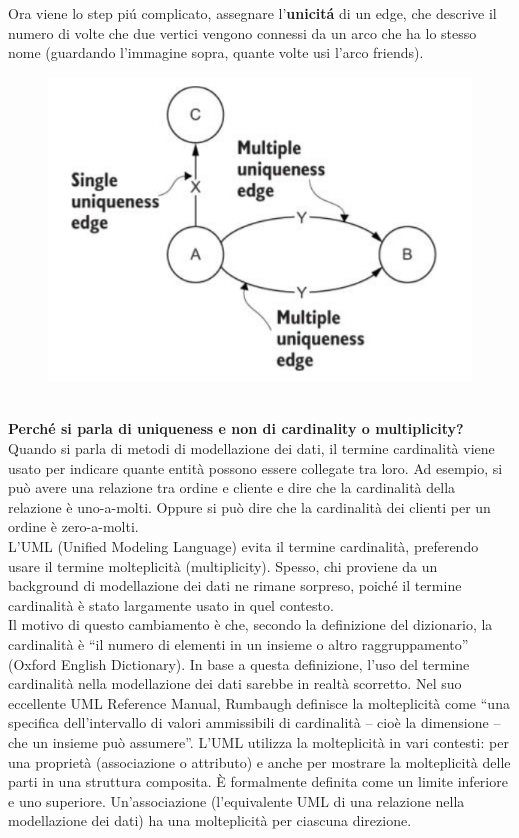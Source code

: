 \newpage

Ora viene lo step piú complicato, assegnare l'\textbf{unicitá} di un edge, che descrive il numero di volte che due vertici vengono connessi da un arco che ha lo stesso nome (guardando l'immagine sopra, quante volte usi l'arco friends). 
\\
\begin{figure}[th]
    \centering
    \includegraphics[width=0.5\linewidth]{GraphModeling//img/uniqueness.png}
\end{figure}
\\
\textbf{Perché si parla di uniqueness e non di cardinality o multiplicity?} Quando si parla di metodi di modellazione dei dati, il termine cardinalità viene usato per indicare quante entità possono essere collegate tra loro. Ad esempio, si può avere una relazione tra ordine e cliente e dire che la cardinalità della relazione è uno-a-molti. Oppure si può dire che la cardinalità dei clienti per un ordine è zero-a-molti. \\
L’UML (Unified Modeling Language) evita il termine cardinalità, preferendo usare il termine molteplicità (multiplicity). Spesso, chi proviene da un background di modellazione dei dati ne rimane sorpreso, poiché il termine cardinalità è stato largamente usato in quel contesto. \\
Il motivo di questo cambiamento è che, secondo la definizione del dizionario, la cardinalità è “il numero di elementi in un insieme o altro raggruppamento” (Oxford English Dictionary). In base a questa definizione, l’uso del termine cardinalità nella modellazione dei dati sarebbe in realtà scorretto. Nel suo eccellente UML Reference Manual, Rumbaugh definisce la molteplicità come “una specifica dell’intervallo di valori ammissibili di cardinalità – cioè la dimensione – che un insieme può assumere”. L’UML utilizza la molteplicità in vari contesti: per una proprietà (associazione o attributo) e anche per mostrare la molteplicità delle parti in una struttura composita. È formalmente definita come un limite inferiore e uno superiore. Un’associazione (l’equivalente UML di una relazione nella modellazione dei dati) ha una molteplicità per ciascuna direzione. 
\newpage

